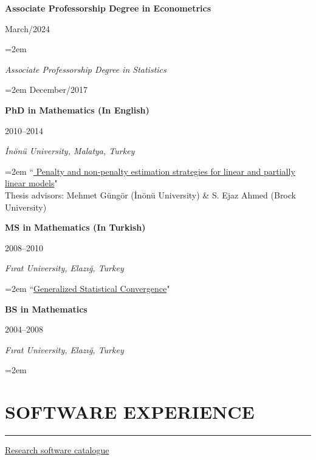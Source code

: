 \documentclass[10pt,letterpaper]{article}
\newcommand{\sepspace}{\vspace*{0.65em}}		%
\newcommand{\NewPart}[2]{%
	\Needspace{7\baselineskip}%
	\vspace{0.45em}%
	\section*{\sffamily\large\bfseries\color{MidnightBlue}\uppercase{#1} #2}%
	\vspace{-0.7em}\noindent\color{MidnightBlue}\rule{\textwidth}{0.55pt}\color{Black}\vspace{0.25em}}
\newcommand{\EducationEntry}[4]{
		\noindent \textbf{#1} \hfill      %
		\parbox{9em}{%
			\hfill\color{Black}#2} \par  %
		\noindent \textit{#3} \par        %
		\noindent\hangindent=2em\hangafter=0 \small #4 %
		\normalsize \par}
\begin{document}
\EducationEntry{Associate Professorship Degree in Econometrics}{March/2024}{}

\EducationEntry{Associate Professorship Degree in Statistics}{December/2017}{}


\EducationEntry{PhD in Mathematics (In English)}{2010--2014}{\.{I}n\"{o}n\"{u} University, Malatya, Turkey}{
{``\href{http://openaccess.inonu.edu.tr:8080/xmlui/handle/11616/5947?locale-attribute=en}{
Penalty and non-penalty estimation strategies for linear and partially linear models}"}\\
Thesis advisors: Mehmet G\"{u}ng\"{o}r (\.{I}n\"{o}n\"{u} University) \& S. Ejaz Ahmed (Brock University)}





\sepspace
\EducationEntry{MS in Mathematics (In Turkish)}{2008--2010}{F{\i}rat University, Elaz{\i}\u{g}, Turkey}{{``\href{https://openaccess.firat.edu.tr/xmlui/handle/11508/17055?locale-attribute=en}{Generalized Statistical Convergence}"}\\
}


\sepspace
\EducationEntry{BS in Mathematics}{2004--2008}{F{\i}rat University, Elaz{\i}\u{g}, Turkey}



\clearpage\NewPart{Software Experience}{}

\noindent\href{https://byuzbasi.github.io/en/software/}{Research software catalogue}
\end{document}

